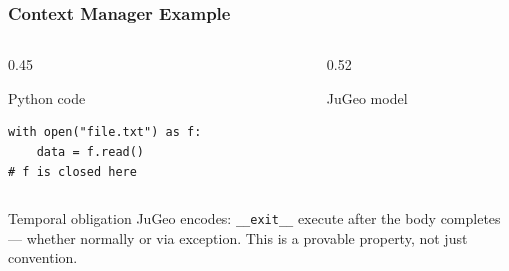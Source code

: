 \begin{frame}[fragile]
\frametitle{Context Manager Example}
\begin{columns}[T]
\begin{column}{0.45\textwidth}
\begin{exampleblock}{Python code}
\begin{lstlisting}
with open("file.txt") as f:
    data = f.read()
# f is closed here
\end{lstlisting}
\end{exampleblock}
\end{column}
\begin{column}{0.52\textwidth}
\begin{block}{JuGeo model}
\end{block}
\end{column}
\end{columns}
\vfill
\begin{block}{Temporal obligation}
  JuGeo encodes: \texttt{\_\_exit\_\_}  execute after the body completes ---
  whether normally or via exception. This is a provable property, not just convention.
\end{block}
\end{frame}

